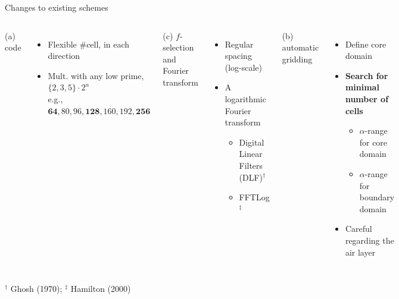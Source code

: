 \documentclass[xcolor=svgnames, aspectratio=169]{beamer}
\begin{document}
  \begin{frame}%
    {Changes to existing schemes}
    \begin{columns}
      \alert{(a) code}
      \begin{itemize}
        \item Flexible \#cell, in each direction
        \item Mult. with any low prime, $\{2,3,5\}\cdot2^n$\\
          e.g., ${\mathbf{64},  80,  96, \mathbf{128}, 160, 192, \mathbf{256}}$
      \end{itemize}
      \vspace{2em}
      \alert{(c) $f$-selection and Fourier transform}
      \begin{itemize}
        \item Regular spacing (log-scale)
        \item A logarithmic Fourier transform
          \begin{itemize}
            \item Digital Linear Filters (DLF)$^\dagger$
            \item FFTLog $^\ddagger$
          \end{itemize}
      \end{itemize}
      \alert{(b) automatic gridding}
      \begin{itemize}
        \item Define core domain
        \item \textbf{Search for minimal number of cells}
        \begin{itemize}
          \item $\alpha$-range for core domain
          \item $\alpha$-range for boundary domain
        \end{itemize}
        \item Careful regarding the air layer
      \end{itemize}
    \end{columns}
    {\tiny $^\dagger$ Ghosh (1970); $^\ddagger$ Hamilton (2000)}
  \end{frame}
\end{document}
